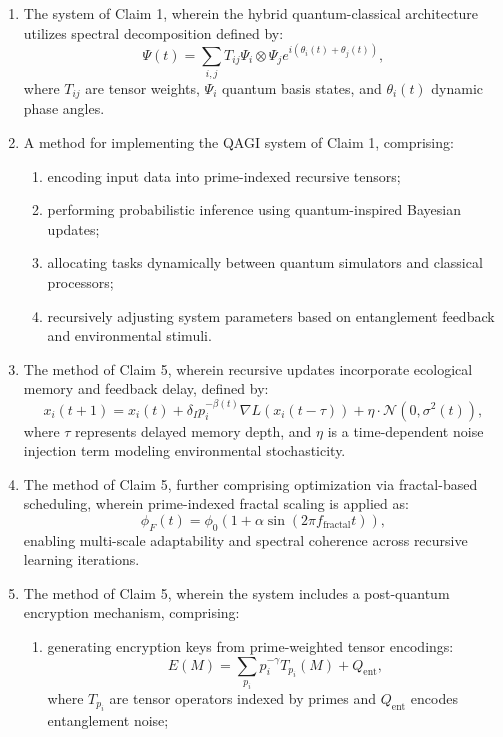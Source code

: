 \documentclass{article}
\theoremstyle{plain}
\theoremstyle{claimstyle}
\begin{document}
\begin{enumerate}
\item The system of Claim 1, wherein the hybrid quantum-classical architecture utilizes spectral decomposition defined by:
    \[
    \Psi(t) = \sum_{i,j} T_{ij} \Psi_i \otimes \Psi_j e^{i(\theta_i(t) + \theta_j(t))},
    \]
    where $T_{ij}$ are tensor weights, $\Psi_i$ quantum basis states, and $\theta_i(t)$ dynamic phase angles.

\item A method for implementing the QAGI system of Claim 1, comprising:
    \begin{enumerate}
        \item encoding input data into prime-indexed recursive tensors;
        \item performing probabilistic inference using quantum-inspired Bayesian updates;
        \item allocating tasks dynamically between quantum simulators and classical processors;
        \item recursively adjusting system parameters based on entanglement feedback and environmental stimuli.
    \end{enumerate}

\item The method of Claim 5, wherein recursive updates incorporate ecological memory and feedback delay, defined by:
    \[
    x_i(t+1) = x_i(t) + \delta_I p_i^{-\beta(t)} \nabla L(x_i(t - \tau)) + \eta \cdot \mathcal{N}(0, \sigma^2(t)),
    \]
    where $\tau$ represents delayed memory depth, and $\eta$ is a time-dependent noise injection term modeling environmental stochasticity.

\item The method of Claim 5, further comprising optimization via fractal-based scheduling, wherein prime-indexed fractal scaling is applied as:
    \[
    \phi_F(t) = \phi_0 \left(1 + \alpha \sin(2\pi f_{\text{fractal}} t)\right),
    \]
    enabling multi-scale adaptability and spectral coherence across recursive learning iterations.

\item The method of Claim 5, wherein the system includes a post-quantum encryption mechanism, comprising:
    \begin{enumerate}
        \item generating encryption keys from prime-weighted tensor encodings:
        \[
        E(M) = \sum_{p_i} p_i^{-\gamma} T_{p_i}(M) + Q_{\text{ent}},
        \]
        where $T_{p_i}$ are tensor operators indexed by primes and $Q_{\text{ent}}$ encodes entanglement noise;


\end{enumerate}
\end{enumerate}
\end{document}
